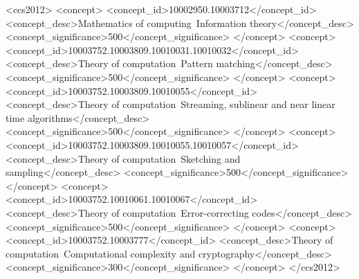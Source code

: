 \documentclass[sigconf]{acmart}
\begin{document}
\begin{CCSXML}
	<ccs2012>
	<concept>
	<concept_id>10002950.10003712</concept_id>
	<concept_desc>Mathematics of computing~Information theory</concept_desc>
	<concept_significance>500</concept_significance>
	</concept>
	<concept>
	<concept_id>10003752.10003809.10010031.10010032</concept_id>
	<concept_desc>Theory of computation~Pattern matching</concept_desc>
	<concept_significance>500</concept_significance>
	</concept>
	<concept>
	<concept_id>10003752.10003809.10010055</concept_id>
	<concept_desc>Theory of computation~Streaming, sublinear and near linear time algorithms</concept_desc>
	<concept_significance>500</concept_significance>
	</concept>
	<concept>
	<concept_id>10003752.10003809.10010055.10010057</concept_id>
	<concept_desc>Theory of computation~Sketching and sampling</concept_desc>
	<concept_significance>500</concept_significance>
	</concept>
	<concept>
	<concept_id>10003752.10010061.10010067</concept_id>
	<concept_desc>Theory of computation~Error-correcting codes</concept_desc>
	<concept_significance>500</concept_significance>
	</concept>
	<concept>
	<concept_id>10003752.10003777</concept_id>
	<concept_desc>Theory of computation~Computational complexity and cryptography</concept_desc>
	<concept_significance>300</concept_significance>
	</concept>
	</ccs2012>
\end{CCSXML}


\maketitle







%




\end{document}
